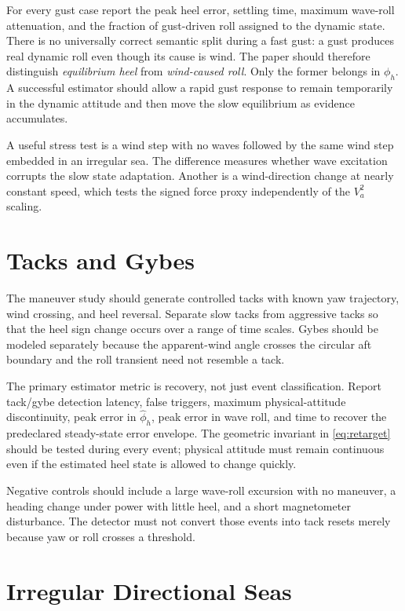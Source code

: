 \documentclass[conference]{IEEEtran}
\begin{document}
For every gust case report the peak heel error, settling time, maximum wave-roll
attenuation, and the fraction of gust-driven roll assigned to the dynamic state. There is
no universally correct semantic split during a fast gust: a gust produces real dynamic
roll even though its cause is wind. The paper should therefore distinguish
\emph{equilibrium heel} from \emph{wind-caused roll}. Only the former belongs in
$\phi_h$. A successful estimator should allow a rapid gust response to remain temporarily
in the dynamic attitude and then move the slow equilibrium as evidence accumulates.

A useful stress test is a wind step with no waves followed by the same wind step embedded
in an irregular sea. The difference measures whether wave excitation corrupts the slow
state adaptation. Another is a wind-direction change at nearly constant speed, which
tests the signed force proxy independently of the $V_a^2$ scaling.

\section{Tacks and Gybes}
\label{sec:tack-gybe-study}

The maneuver study should generate controlled tacks with known yaw trajectory, wind
crossing, and heel reversal. Separate slow tacks from aggressive tacks so that the heel
sign change occurs over a range of time scales. Gybes should be modeled separately
because the apparent-wind angle crosses the circular aft boundary and the roll transient
need not resemble a tack.

The primary estimator metric is recovery, not just event classification. Report tack/gybe
detection latency, false triggers, maximum physical-attitude discontinuity, peak error in
$\hat\phi_h$, peak error in wave roll, and time to recover the predeclared steady-state
error envelope. The geometric invariant in \eqref{eq:retarget} should be tested during
every event; physical attitude must remain continuous even if the estimated heel state is
allowed to change quickly.

Negative controls should include a large wave-roll excursion with no maneuver, a heading
change under power with little heel, and a short magnetometer disturbance. The detector
must not convert those events into tack resets merely because yaw or roll crosses a
threshold.

\section{Irregular Directional Seas}
\label{sec:directional-seas}
\end{document}
